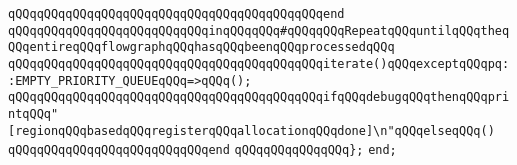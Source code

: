 \verb|qQQqqQQqqQQqqQQqqQQqqQQqqQQqqQQqqQQqqQQqqQQqend|\newline
\newline
\verb|qQQqqQQqqQQqqQQqqQQqqQQqqQQqinqQQqqQQq#qQQqqQQqRepeatqQQquntilqQQqtheqQQqentireqQQqflowgraphqQQqhasqQQqbeenqQQqprocessedqQQq|\newline
\verb|qQQqqQQqqQQqqQQqqQQqqQQqqQQqqQQqqQQqqQQqqQQqiterate()qQQqexceptqQQqpq::EMPTY_PRIORITY_QUEUEqQQq=>qQQq();|\newline
\verb|qQQqqQQqqQQqqQQqqQQqqQQqqQQqqQQqqQQqqQQqqQQqifqQQqdebugqQQqthenqQQqprintqQQq"[regionqQQqbasedqQQqregisterqQQqallocationqQQqdone]\n"qQQqelseqQQq()|\newline
\verb|qQQqqQQqqQQqqQQqqQQqqQQqqQQqend|\newline
\newline
\verb|qQQqqQQqqQQqqQQq};|\newline
\verb|end;|\newline

